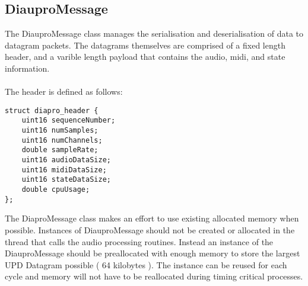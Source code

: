 \subsection{DiauproMessage}

The DiauproMessage class manages the serialisation and deserialisation of data to datagram packets. The datagrams themselves are comprised of a fixed length header, and a varible length payload that contains the audio, midi, and state information.\\
\\
The header is defined as follows:

\begin{lstlisting}
struct diapro_header {
    uint16 sequenceNumber;
    uint16 numSamples;
    uint16 numChannels;
    double sampleRate;
    uint16 audioDataSize;
    uint16 midiDataSize;
    uint16 stateDataSize;
    double cpuUsage;
};
\end{lstlisting}

The DiaproMessage class makes an effort to use existing allocated memory when possible. Instances of DiauproMessage should not be created or allocated in the thread that calls the audio processing routines. Instead an instance of the DiauproMessage should be preallocated with enough memory to store the largest UPD Datagram possible ( 64 kilobytes ). The instance can be reused for each cycle and memory will not have to be reallocated during timing critical processes.

